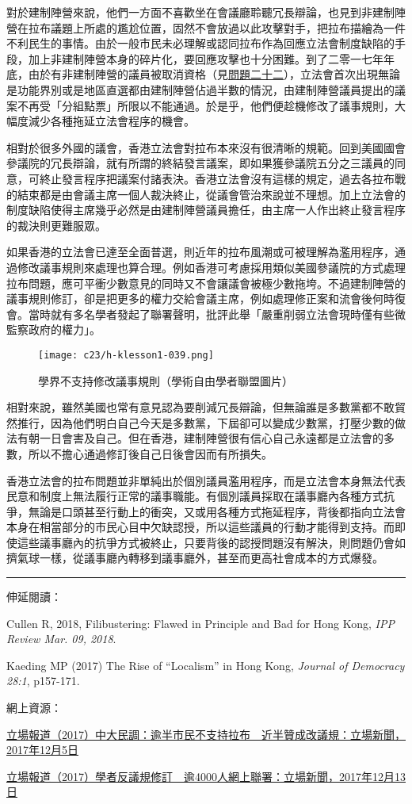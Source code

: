 對於建制陣營來說，他們一方面不喜歡坐在會議廳聆聽冗長辯論，也見到非建制陣營在拉布議題上所處的尷尬位置，固然不會放過以此攻擊對手，把拉布描繪為一件不利民生的事情。由於一般市民未必理解或認同拉布作為回應立法會制度缺陷的手段，加上非建制陣營本身的碎片化，要回應攻擊也十分困難。到了二零一七年年底，由於有非建制陣營的議員被取消資格（見\hyperref[sec:sec22]{問題二十二}），立法會首次出現無論是功能界別或是地區直選都由建制陣營佔過半數的情況，由建制陣營議員提出的議案不再受「分組點票」所限以不能通過。於是乎，他們便趁機修改了議事規則，大幅度減少各種拖延立法會程序的機會。

相對於很多外國的議會，香港立法會對拉布本來沒有很清晰的規範。回到美國國會參議院的冗長辯論，就有所謂的終結發言議案，即如果獲參議院五分之三議員的同意，可終止發言程序把議案付諸表決。香港立法會沒有這樣的規定，過去各拉布戰的結束都是由會議主席一個人裁決終止，從議會管治來說並不理想。加上立法會的制度缺陷使得主席幾乎必然是由建制陣營議員擔任，由主席一人作出終止發言程序的裁決則更難服眾。

如果香港的立法會已達至全面普選，則近年的拉布風潮或可被理解為濫用程序，通過修改議事規則來處理也算合理。例如香港可考慮採用類似美國參議院的方式處理拉布問題，應可平衝少數意見的同時又不會讓議會被極少數拖垮。不過建制陣營的議事規則修訂，卻是把更多的權力交給會議主席，例如處理修正案和流會後何時復會。當時就有多名學者發起了聯署聲明，批評此舉「嚴重削弱立法會現時僅有些微監察政府的權力」。

\begin{figure}[htbp]
    \centering
    \texttt{[image: c23/h-klesson1-039.png]}
    \caption{學界不支持修改議事規則（學術自由學者聯盟圖片）}
\end{figure}

相對來說，雖然美國也常有意見認為要削減冗長辯論，但無論誰是多數黨都不敢貿然推行，因為他們明白自己今天是多數黨，下屆卻可以變成少數黨，打壓少數的做法有朝一日會害及自己。但在香港，建制陣營很有信心自己永遠都是立法會的多數，所以不擔心通過修訂後自己日後會因而有所損失。

香港立法會的拉布問題並非單純出於個別議員濫用程序，而是立法會本身無法代表民意和制度上無法履行正常的議事職能。有個別議員採取在議事廳內各種方式抗爭，無論是口頭甚至行動上的衝突，又或用各種方式拖延程序，背後都指向立法會本身在相當部分的市民心目中欠缺認授，所以這些議員的行動才能得到支持。而即使這些議事廳內的抗爭方式被終止，只要背後的認授問題沒有解決，則問題仍會如擠氣球一樣，從議事廳內轉移到議事廳外，甚至而更高社會成本的方式爆發。

\rule[-10pt]{15cm}{0.05em}

伸延閱讀：

Cullen R, 2018, Filibustering: Flawed in Principle and Bad for Hong Kong, \textit{IPP Review Mar. 09, 2018}.

Kaeding MP (2017) The Rise of “Localism” in Hong Kong, \textit{Journal of Democracy 28:1}, p157-171.


網上資源：

\href{https://thestandnews.com/politics/中大民調-逾半市民不支持拉布/}{立場報道（2017）中大民調：逾半市民不支持拉布　近半贊成改議規：立場新聞，2017年12月5日}

\href{https://thestandnews.com/politics/學者反議規修訂-逾4000人網上聯署/}{立場報道（2017）學者反議規修訂　逾4000人網上聯署：立場新聞，2017年12月13日}